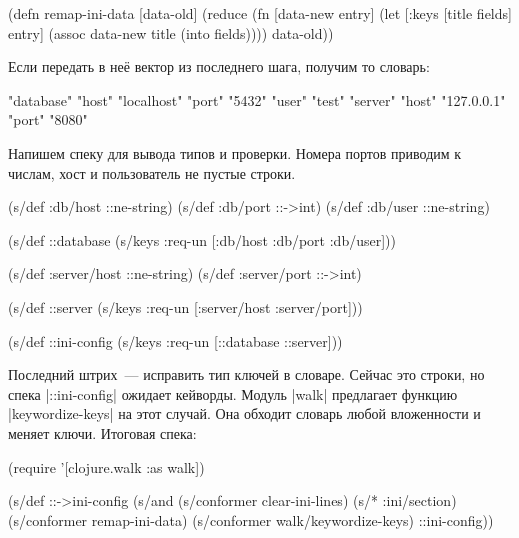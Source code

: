 \begin{english}
  \begin{clojure}
(defn remap-ini-data [data-old]
  (reduce
   (fn [data-new entry]
     (let [{:keys [title fields]} entry]
       (assoc data-new title (into {} fields))))
   {}
   data-old))
  \end{clojure}
\end{english}

\noindent
Если передать в не\"{е} вектор из последнего шага, получим то словарь:

\begin{english}
  \begin{clojure}
{"database" {"host" "localhost" "port" "5432" "user" "test"}
 "server" {"host" "127.0.0.1" "port" "8080"}}
  \end{clojure}
\end{english}

Напишем спеку для вывода типов и проверки. Номера портов приводим к числам, хост
и пользователь не пустые строки.

\begin{english}
  \begin{clojure}
(s/def :db/host ::ne-string)
(s/def :db/port ::->int)
(s/def :db/user ::ne-string)

(s/def ::database
  (s/keys :req-un [:db/host :db/port :db/user]))

(s/def :server/host ::ne-string)
(s/def :server/port ::->int)

(s/def ::server
  (s/keys :req-un [:server/host :server/port]))

(s/def ::ini-config
  (s/keys :req-un [::database ::server]))
  \end{clojure}
\end{english}


Последний штрих~--- исправить тип ключей в словаре. Сейчас это строки, но спека
\spverb|::ini-config| ожидает кейворды. Модуль \spverb|walk| предлагает функцию
\spverb|keywordize-keys| на этот случай. Она обходит словарь любой вложенности и
меняет ключи. Итоговая спека:

\begin{english}
  \begin{clojure}
(require '[clojure.walk :as walk])

(s/def ::->ini-config
  (s/and
   (s/conformer clear-ini-lines)
   (s/* :ini/section)
   (s/conformer remap-ini-data)
   (s/conformer walk/keywordize-keys)
   ::ini-config))
  \end{clojure}
\end{english}

